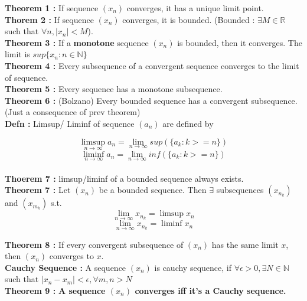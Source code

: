 \documentclass{report}
\begin{document}
\noindent \textbf{Theorem 1 :} If sequence $(x_n)$ converges, it has a unique limit point.\\

\noindent \textbf{Thorem 2 :} If sequence $(x_n)$ converges, it is bounded. (Bounded : $\exists M \in \mathbb{R}$ such that $\forall n,  |x_n| < M$).\\

\noindent \textbf{Theorem 3 :} If a \textbf{monotone} sequence $(x_n)$ is bounded, then it converges. The limit is $sup\{x_n : n \in \mathbb{N}\}$ \\

\noindent \textbf{Theorem 4 :} Every subsequence of a convergent sequence converges to the limit of sequence.\\

\noindent \textbf{Theorem 5 :} Every sequence has a monotone subsequence.\\

\noindent \textbf{Theorem 6 :} (Bolzano) Every bounded sequence has a convergent subsequence. (Just a consequence of prev theorem)\\

\noindent \textbf{Defn :} Limsup/ Liminf of sequence $(a_n)$ are defined by 

$$\limsup_{n\to\infty} a_n = \lim_{n\to\infty}sup(\{a_k : k>=n\})$$ 
$$\liminf_{n\to\infty} a_n = \lim_{n\to\infty}inf(\{a_k : k>=n\})$$ \\

\noindent \textbf{Thoerem 7 :} limsup/liminf of a bounded sequence always exists.\\

\noindent \textbf{Theorem 7 :} Let $(x_n)$ be a bounded sequence. Then $\exists$ subsequences $(x_{n_k})$ and $(x_{m_k})$ s.t.
$$\lim_{n\to\infty}x_{n_k} = \limsup x_n$$
$$\lim_{n\to\infty}x_{n_k} = \liminf x_n$$



\noindent \textbf{Theorem 8 :} If every convergent subsequence of $(x_n)$ has the same limit $x$, then $(x_n)$ converges to $x$.\\

\noindent \textbf{Cauchy Sequence :} A sequence $(x_n)$ is cauchy sequence, if $\forall \epsilon > 0, \exists N \in \mathbb{N}$ such that $|x_n - x_m| < \epsilon , \forall m,n> N$\\

\noindent \textbf{Theorem 9 :} \textbf{A sequence $(x_n)$ converges iff it's a Cauchy sequence.}\\
\end{document}
